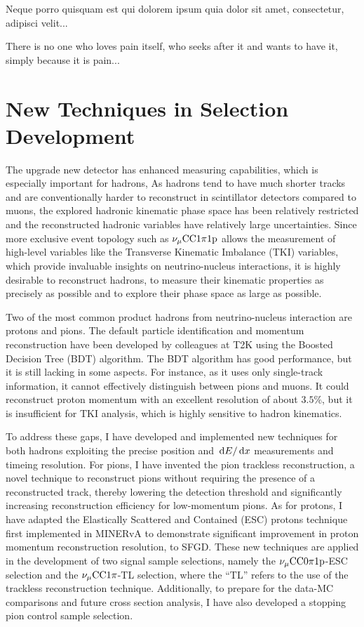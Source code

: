 \begin{savequote}[8cm]
\textlatin{Neque porro quisquam est qui dolorem ipsum quia dolor sit amet, consectetur, adipisci velit...}

There is no one who loves pain itself, who seeks after it and wants to have it, simply because it is pain...
\end{savequote}

\chapter{\label{ch:techniques}New Techniques in Selection Development} 
\minitoc

The upgrade new detector has enhanced measuring capabilities, which is especially important for hadrons,
As hadrons tend to have much shorter tracks and are conventionally harder to reconstruct in scintillator detectors compared to muons, the explored hadronic kinematic phase space has been relatively restricted and the reconstructed hadronic variables have relatively large uncertainties.
Since more exclusive event topology such as $\nu_{\mu}\textrm{CC}1\pi1\textrm{p}$ allows the measurement of high-level variables like the Transverse Kinematic Imbalance (TKI) variables, which provide invaluable insights on neutrino-nucleus interactions, it is highly desirable to reconstruct hadrons, to measure their kinematic properties as precisely as possible and to explore their phase space as large as possible.

Two of the most common product hadrons from neutrino-nucleus interaction are protons and pions. 
The default particle identification and momentum reconstruction have been developed by colleagues at T2K using the Boosted Decision Tree (BDT) algorithm. The BDT algorithm has good performance, but it is still lacking in some aspects.
For instance, as it uses only single-track information, it cannot effectively distinguish between pions and muons. 
It could reconstruct proton momentum with an excellent resolution of about $3.5\%$, but it is insufficient for TKI analysis, which is highly sensitive to hadron kinematics. 

To address these gaps, I have developed and implemented new techniques for both hadrons exploiting the precise position and $\,\textrm{d}E/\,\textrm{d}x$ measurements and timeing resolution.
For pions, I have invented the pion trackless reconstruction, a novel technique to reconstruct pions without requiring the presence of a reconstructed track, thereby lowering the detection threshold and significantly increasing reconstruction efficiency for low-momentum pions. 
As for protons, I have adapted the Elastically Scattered and Contained (ESC) protons technique~\cite{Lu:2016mjf} first implemented in MINERvA to demonstrate significant improvement in proton momentum reconstruction resolution, to SFGD. 
These new techniques are applied in the development of two signal sample selections, namely the $\nu_{\mu}\textrm{CC}0\pi1\textrm{p}$-ESC selection and the $\nu_{\mu}\textrm{CC}1\pi$-TL selection, where the ``TL'' refers to the use of the trackless reconstruction technique.
Additionally, to prepare for the data-MC comparisons and future cross section analysis, I have also developed a stopping pion control sample selection.

